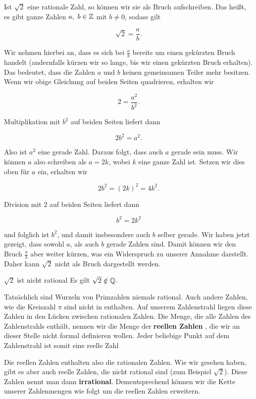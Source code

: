 \documentclass[../../main.tex]{subfiles}
\begin{document}
	Ist $\sqrt{2}$ eine rationale Zahl, so können wir sie als Bruch aufschreiben. Das heißt, es gibt ganze Zahlen $a, \ b\in\Integer$ mit $b \neq 0$, sodass gilt
	
	$$\sqrt{2} = \frac{a}{b}.$$
	
	Wir nehmen hierbei an, dass es sich bei $\frac{a}{b}$ bereits um einen gekürzten Bruch handelt (andernfalls kürzen wir so lange, bis wir einen gekürzten Bruch erhalten). Das bedeutet, dass die Zahlen $a$ und $b$ keinen gemeinsamen Teiler mehr besitzen. Wenn wir obige Gleichung auf beiden Seiten quadrieren, erhalten wir
	
	$$2 = \frac{a^2}{b^2}.$$
	
	Multiplikation mit $b^2$ auf beiden Seiten liefert dann
	
	$$2b^2 = a^2.$$ 
	
	Also ist $a^2$ eine gerade Zahl. Daraus folgt, dass auch $a$ gerade sein muss. Wir können $a$ also schreiben als 
	$a = 2k$, wobei $k$ eine ganze Zahl ist. Setzen wir dies oben für $a$ ein, erhalten wir
	
	$$2b^2 = \left(2k\right)^2 = 4k^2.$$
	
	Division mit $2$ auf beiden Seiten liefert dann
	
	$$b^2 = 2k^2$$
	
	und folglich ist $b^2$, und damit insbesondere auch $b$ selber gerade. Wir haben jetzt gezeigt, dass sowohl $a$, als auch $b$ gerade Zahlen sind. Damit können wir den Bruch $\frac{a}{b}$ aber weiter kürzen, was ein Widerspruch zu unserer Annahme darstellt. Daher kann $\sqrt{2}$ nicht als Bruch dargestellt werden.
	
	\begin{theorem}{$\sqrt{2}$ ist nicht rational}
		Es gilt $\sqrt{2}\notin\mathbb{Q}$.
	\end{theorem}

	Tatsächlich sind Wurzeln von Primzahlen niemals rational. Auch andere Zahlen, wie die Kreiszahl $\pi$ sind nicht in \Rational enthalten. Auf unserem Zahlenstrahl liegen diese Zahlen in den Lücken zwischen rationalen Zahlen. Die Menge, die alle Zahlen des Zahlenstrahls enthält, nennen wir die Menge der \textbf{reellen Zahlen} \Real, die wir an dieser Stelle nicht formal definieren wollen. Jeder beliebige Punkt auf dem Zahlenstrahl ist somit eine reelle Zahl
	
	Die reellen Zahlen enthalten also die rationalen Zahlen. Wie wir gesehen haben, gibt es aber auch reelle Zahlen, die nicht rational sind (zum Beispiel $\sqrt{2}$). Diese Zahlen nennt man dann \textbf{irrational}. Dementsprechend können wir die Kette unserer Zahlenmengen wie folgt um die reellen Zahlen erweitern. 
	
\end{document}
